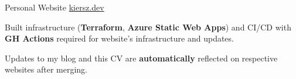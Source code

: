 \begin{cventries}
    \cventry
    {Personal Website}
    {\href{https://kiersz.dev/}{kiersz.dev}}
    {} %
    {} %
    {
         \begin{cvitems} 
        \item Built infrastructure (\textbf{Terraform}, \textbf{Azure Static Web Apps}) and CI/CD with \textbf{GH Actions} required for website's infrastructure and updates. 
        \item Updates to my blog and this CV are \textbf{automatically} reflected on respective websites after merging.
        \end{cvitems}
    }

\end{cventries}
